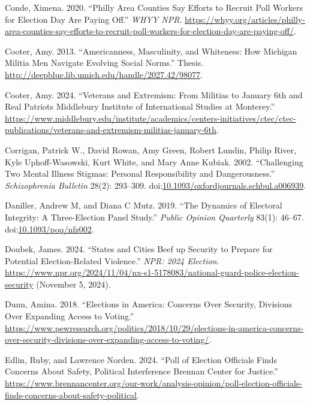 \documentclass[
  12pt,
  letterpaper,
]{article}
\newlength{\cslhangindent}
\newenvironment{CSLReferences}[2] %
 {\begin{list}{}{%
  \setlength{\itemindent}{0pt}
  \setlength{\leftmargin}{0pt}
  \setlength{\parsep}{0pt}
  \ifodd #1
   \setlength{\leftmargin}{\cslhangindent}
   \setlength{\itemindent}{-1\cslhangindent}
  \fi
  \setlength{\itemsep}{#2\baselineskip}}}
 {\end{list}}
\begin{document}
\begin{CSLReferences}{1}{1}
Conde, Ximena. 2020. {``Philly Area Counties Say Efforts to Recruit Poll
Workers for {Election Day} Are Paying Off.''} \emph{WHYY NPR}.
\url{https://whyy.org/articles/philly-area-counties-say-efforts-to-recruit-poll-workers-for-election-day-are-paying-off/}.

Cooter, Amy. 2013. {``Americanness, {Masculinity}, and {Whiteness}: {How
Michigan Militia Men Navigate Evolving Social Norms}.''} Thesis.
\url{http://deepblue.lib.umich.edu/handle/2027.42/98077}.

Cooter, Amy. 2024. {``Veterans and {Extremism}: {From Militias} to
{January} 6th and {Real Patriots} \textbar{} {Middlebury Institute} of
{International Studies} at {Monterey}.''}
\url{https://www.middlebury.edu/institute/academics/centers-initiatives/ctec/ctec-publications/veterans-and-extremism-militias-january-6th}.

Corrigan, Patrick W., David Rowan, Amy Green, Robert Lundin, Philip
River, Kyle Uphoff-Wasowski, Kurt White, and Mary Anne Kubiak. 2002.
{``Challenging {Two Mental Illness Stigmas}: {Personal Responsibility}
and {Dangerousness}.''} \emph{Schizophrenia Bulletin} 28(2): 293--309.
doi:\href{https://doi.org/10.1093/oxfordjournals.schbul.a006939}{10.1093/oxfordjournals.schbul.a006939}.

Daniller, Andrew M, and Diana C Mutz. 2019. {``The {Dynamics} of
{Electoral Integrity}: {A Three-Election Panel Study}.''} \emph{Public
Opinion Quarterly} 83(1): 46--67.
doi:\href{https://doi.org/10.1093/poq/nfz002}{10.1093/poq/nfz002}.

Doubek, James. 2024. {``States and Cities Beef up Security to Prepare
for Potential Election-Related Violence.''} \emph{NPR: 2024 Election}.
\url{https://www.npr.org/2024/11/04/nx-s1-5178083/national-guard-police-election-security}
(November 5, 2024).

Dunn, Amina. 2018. {``Elections in {America}: {Concerns Over Security},
{Divisions Over Expanding Access} to {Voting}.''}
\url{https://www.pewresearch.org/politics/2018/10/29/elections-in-america-concerns-over-security-divisions-over-expanding-access-to-voting/}.

Edlin, Ruby, and Lawrence Norden. 2024. {``Poll of {Election Officials
Finds Concerns About Safety}, {Political Interference} \textbar{}
{Brennan Center} for {Justice}.''}
\url{https://www.brennancenter.org/our-work/analysis-opinion/poll-election-officials-finds-concerns-about-safety-political}.


\end{CSLReferences}
\end{document}

